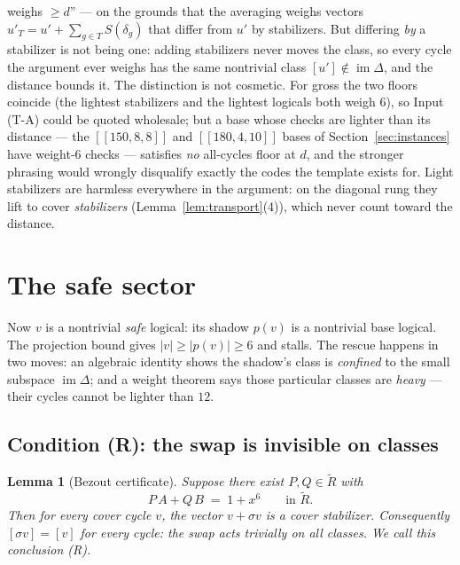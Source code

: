 \documentclass[11pt]{article}
\theoremstyle{plain}
\newtheorem{lemma}[theorem]{Lemma}
\theoremstyle{definition}
\theoremstyle{remark}
\newcommand{\imD}{\operatorname{im}\Delta}
\newcommand{\Rcov}{\widetilde{R}}
\newcommand{\wt}[1]{\lvert #1\rvert}
\begin{document}
\begin{enumerate}[leftmargin=2.2em]
  weighs $\geq d$'' --- on the grounds that the averaging weighs vectors
  $u'_T = u' + \sum_{g \in T} S(\delta_g)$ that differ from $u'$ by
  stabilizers. But differing \emph{by} a stabilizer is not being one:
  adding stabilizers never moves the class, so every cycle the argument
  ever weighs has the same nontrivial class $[u'] \notin \imD$, and the
  distance bounds it. The distinction is not cosmetic. For gross the two
  floors coincide (the lightest stabilizers and the lightest logicals both
  weigh $6$), so Input (T-A) could be quoted wholesale; but a base whose
  checks are lighter than its distance --- the $[[150,8,8]]$ and
  $[[180,4,10]]$ bases of Section~\ref{sec:instances} have weight-6 checks
  --- satisfies \emph{no} all-cycles floor at $d$, and the stronger
  phrasing would wrongly disqualify exactly the codes the template exists
  for. Light stabilizers are harmless everywhere in the argument: on the
  diagonal rung they lift to cover \emph{stabilizers}
  (Lemma~\ref{lem:transport}(4)), which never count toward the distance.
\end{enumerate}

\section{The safe sector}
\label{sec:safe}

Now $v$ is a nontrivial \emph{safe} logical: its shadow $p(v)$ is a nontrivial
base logical. The projection bound gives $\wt{v} \geq \wt{p(v)} \geq 6$ and
stalls. The rescue happens in two moves: an algebraic identity shows the
shadow's class is \emph{confined} to the small subspace $\imD$; and a weight
theorem says those particular classes are \emph{heavy} --- their cycles cannot
be lighter than $12$.

\subsection{Condition (R): the swap is invisible on classes}

\begin{lemma}[Bezout certificate]\label{lem:bezout}
Suppose there exist $P, Q \in \Rcov$ with
\[
P\,A + Q\,B \;=\; 1 + x^6 \qquad\text{in } \Rcov .
\]
Then for \emph{every} cover cycle $v$, the vector $v + \sigma v$ is a cover
stabilizer. Consequently $[\sigma v] = [v]$ for every cycle: the swap acts
trivially on all classes. We call this conclusion \emph{(R)}.
\end{lemma}
\end{document}
